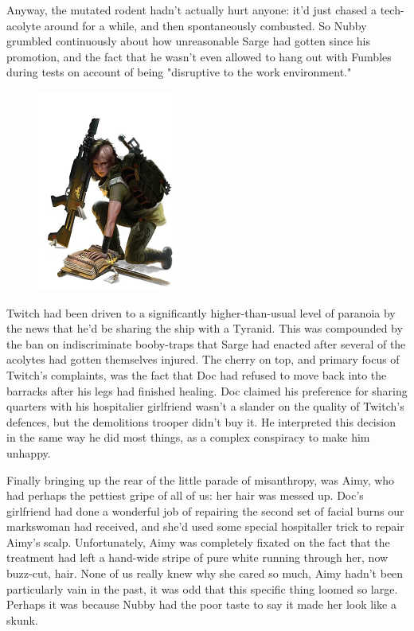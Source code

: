 Anyway, the mutated rodent hadn't actually hurt anyone: 
it'd just chased a tech-acolyte around for a while, and then spontaneously combusted. 
So Nubby grumbled continuously about how unreasonable Sarge had gotten since his promotion, and the fact that he wasn't even allowed to hang out with Fumbles during tests on account of being "disruptive to the work environment."
\begin{figure}
	\begin{center}
		\includegraphics[width=\figwidth]{pics/12/10.png}
	\end{center}
\end{figure}
Twitch had been driven to a significantly higher-than-usual level of paranoia by the news that he'd be sharing the ship with a Tyranid. 
This was compounded by the ban on indiscriminate booby-traps that Sarge had enacted after several of the acolytes had gotten themselves injured. 
The cherry on top, and primary focus of Twitch's complaints, was the fact that Doc had refused to move back into the barracks after his legs had finished healing. 
Doc claimed his preference for sharing quarters with his hospitalier girlfriend wasn't a slander on the quality of Twitch's defences, but the demolitions trooper didn't buy it. 
He interpreted this decision in the same way he did most things, as a complex conspiracy to make him unhappy.

Finally bringing up the rear of the little parade of misanthropy, was Aimy, who had perhaps the pettiest gripe of all of us: 
her hair was messed up. 
Doc's girlfriend had done a wonderful job of repairing the second set of facial burns our markswoman had received, and she'd used some special hospitaller trick to repair Aimy's scalp. 
Unfortunately, Aimy was completely fixated on the fact that the treatment had left a hand-wide stripe of pure white running through her, now buzz-cut, hair. 
None of us really knew why she cared so much, Aimy hadn't been particularly vain in the past, it was odd that this specific thing loomed so large. 
Perhaps it was because Nubby had the poor taste to say it made her look like a skunk.

